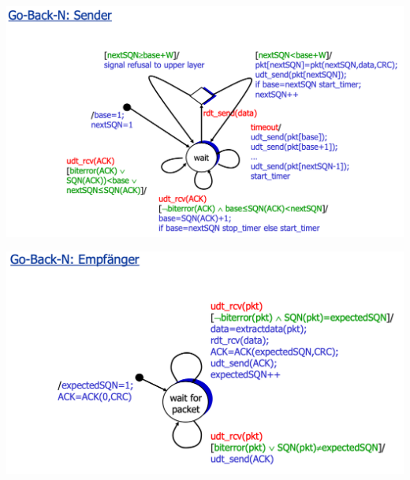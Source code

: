 \begin{multicols}{2}
\begin{center}
	\includegraphics[scale=0.125]{images/Go-Back-N_Sender.png}
\end{center}	
\begin{center}
	\includegraphics[scale=0.125]{images/Go-Back-N_Empfaenger.png}
\end{center}
\end{multicols}
